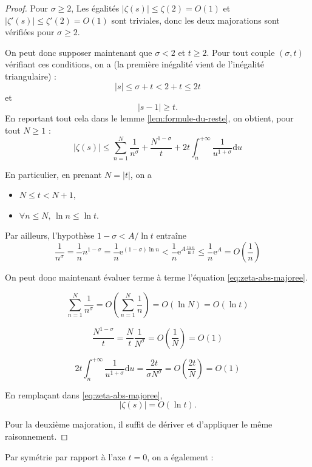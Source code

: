 \documentclass[french]{report}
\begin{document}
\begin{proof}
  Pour $\sigma\geq2$, Les égalités $|\zeta(s)|\leq\zeta(2)=O(1)$ et $|\zeta'(s)|\leq\zeta'(2)=O(1)$ sont triviales, donc les deux majorations sont vérifiées pour $\sigma\geq2$.

  On peut donc supposer maintenant que $\sigma<2$ et $t\geq2$. Pour tout couple $(\sigma, t)$ vérifiant ces conditions, on a (la première inégalité vient de l'inégalité triangulaire) :
  \[ |s|\leq\sigma+t<2+t\leq 2t \]
  et
  \[ |s-1|\geq t. \]
  En reportant tout cela dans le lemme \ref{lem:formule-du-reste}, on obtient, pour tout $N\geq1$ :
  \begin{equation}\label{eq:zeta-abs-majoree}
    |\zeta(s)|\leq\sum_{n=1}^N\frac{1}{n^\sigma}
    + \frac{N^{1-\sigma}}{t}
    + 2t\int_n^{+\infty}\frac{1}{u^{1+\sigma}}\mathrm{d}u
  \end{equation}
 
  En particulier, en prenant $N=|t|$, on a
  \begin{itemize}
    \item $N\leq t<N+1,$
    \item $\forall n\leq N,\,\ln n\leq\ln t.$
  \end{itemize}

  Par ailleurs, l'hypothèse $1-\sigma<A/\ln t$ entraîne
  \[
    \frac{1}{n^\sigma}
    = \frac{1}{n}n^{1-\sigma}
    = \frac{1}{n}\mathrm{e}^{(1-\sigma)\ln n}
    < \frac{1}{n}\mathrm{e}^{A\frac{\ln n}{\ln t}}
    \leq \frac{1}{n}\mathrm{e}^A
    = O\left(\frac{1}{n}\right)
  \]

  On peut donc maintenant évaluer terme à terme l'équation \ref{eq:zeta-abs-majoree}.

  \[
    \sum_{n=1}^N\frac{1}{n^\sigma}
    = O\left(\sum_{n=1}^N\frac{1}{n}\right)
    = O(\ln N)
    = O(\ln t)
  \]

  \[
    \frac{N^{1-\sigma}}{t}
    = \frac{N}{t}\frac{1}{N^\sigma}
    = O\left(\frac{1}{N}\right)
    = O(1)
  \]

  \[
    2t\int_n^{+\infty}\frac{1}{u^{1+\sigma}}\mathrm{d}u
    = \frac{2t}{\sigma N^\sigma}
    = O\left(\frac{2t}{N}\right)
    = O(1)
  \]

  En remplaçant dans \ref{eq:zeta-abs-majoree},
  \[ |\zeta(s)|=O(\ln t). \]

  Pour la deuxième majoration, il suffit de dériver et d'appliquer le même raisonnement.
\end{proof}

Par symétrie par rapport à l'axe $t=0$, on a également :
\end{document}
